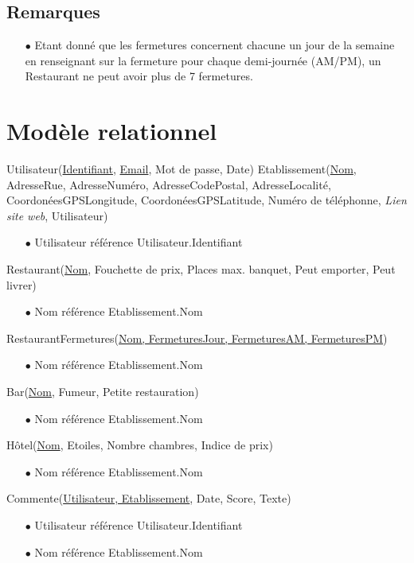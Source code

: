 \documentclass[a4paper, 11pt]{article}
\begin{document}
\subsection*{Remarques}
\begin{itemize}
	\item[$\bullet$] Etant donné que les fermetures concernent chacune un jour de la semaine en renseignant sur la fermeture pour chaque demi-journée (AM/PM), un Restaurant ne peut avoir plus de 7 fermetures. 
\end{itemize}

\section*{Modèle relationnel}
\noindent
Utilisateur(\underline{Identifiant}, \underline{Email}, Mot de passe, Date) \newline
Etablissement(\underline{Nom}, AdresseRue, AdresseNuméro, AdresseCodePostal, AdresseLocalité, CoordonéesGPSLongitude, CoordonéesGPSLatitude, Numéro de téléphonne, \textit{Lien site web}, Utilisateur)
\begin{itemize}
	\item[$\bullet$] Utilisateur référence Utilisateur.Identifiant
\end{itemize}
Restaurant(\underline{Nom}, Fouchette de prix, Places max. banquet, Peut emporter, Peut livrer)
\begin{itemize}
	\item[$\bullet$] Nom référence Etablissement.Nom
\end{itemize}
RestaurantFermetures(\underline{Nom, FermeturesJour, FermeturesAM, FermeturesPM})
\begin{itemize}
	\item[$\bullet$] Nom référence Etablissement.Nom
\end{itemize}
Bar(\underline{Nom}, Fumeur, Petite restauration)
\begin{itemize}
	\item[$\bullet$] Nom référence Etablissement.Nom
\end{itemize}
Hôtel(\underline{Nom}, Etoiles, Nombre chambres, Indice de prix)
\begin{itemize}
	\item[$\bullet$] Nom référence Etablissement.Nom
\end{itemize}
Commente(\underline{Utilisateur, Etablissement}, Date, Score, Texte)
\begin{itemize}
	\item[$\bullet$] Utilisateur référence Utilisateur.Identifiant
	\item[$\bullet$] Nom référence Etablissement.Nom
\end{itemize}
\end{document}
